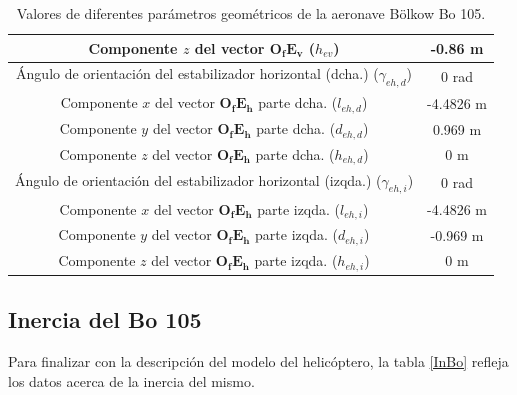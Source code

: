 \begin{table}[htbp]
\begin{tabular}{|>{\columncolor{Gray}}c|c|}
		\cellcolor{Gray}Componente $z$ del vector $\boldsymbol{O_fE_v}$ ($h_{ev}$) & -0.86 m \\ \hline
		\cellcolor{Gray}Ángulo de orientación del estabilizador horizontal (dcha.) ($\gamma_{eh,d}$) & 0 rad \\ \hline
		\cellcolor{Gray}Componente $x$ del vector $\boldsymbol{O_fE_h}$ parte dcha. ($l_{eh,d}$) & -4.4826 m \\ \hline
		\cellcolor{Gray}Componente $y$ del vector $\boldsymbol{O_fE_h}$ parte dcha. ($d_{eh,d}$) & 0.969 m \\ \hline
		\cellcolor{Gray}Componente $z$ del vector $\boldsymbol{O_fE_h}$ parte dcha. ($h_{eh,d}$) & 0 m \\ \hline
		\cellcolor{Gray}Ángulo de orientación del estabilizador horizontal (izqda.) ($\gamma_{eh,i}$) & 0 rad \\ \hline
		\cellcolor{Gray}Componente $x$ del vector $\boldsymbol{O_fE_h}$ parte izqda. ($l_{eh,i}$) & -4.4826 m \\ \hline
		\cellcolor{Gray}Componente $y$ del vector $\boldsymbol{O_fE_h}$ parte izqda. ($d_{eh,i}$) & -0.969 m \\ \hline
		\cellcolor{Gray}Componente $z$ del vector $\boldsymbol{O_fE_h}$ parte izqda. ($h_{eh,i}$) & 0 m \\ \hline
	\end{tabular}%
	\caption{Valores de diferentes parámetros geométricos de la aeronave Bölkow Bo 105.}
	\label{GeBo}
\end{table}%

\subsection{Inercia del Bo 105}

Para finalizar con la descripción del modelo del helicóptero, la tabla \ref{InBo} refleja los datos acerca de la inercia del mismo.


